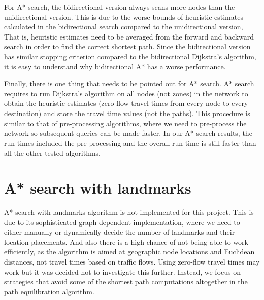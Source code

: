 For A* search,
the bidirectional version always scans more nodes than the unidirectional version.
This is due to the worse bounds of heuristic estimates calculated in the bidirectional search compared to the unidirectional version,
That is, heuristic estimates need to be averaged from the forward and backward search in order to find the correct shortest path.
Since the bidirectional version has similar stopping criterion compared to the bidirectional Dijkstra's algorithm,
it is easy to understand why bidirectional A* has a worse performance.

Finally, there is one thing that needs to be pointed out for A* search.
A* search requires to run Dijkstra's algorithm on all nodes (not zones) in the network to obtain the heuristic estimates (zero-flow travel times from every node to every destination) and store the travel time values (not the paths).
This procedure is similar to that of pre-processing algorithms,
where we need to pre-process the network so subsequent queries can be made faster.
In our A* search results, the run times included the pre-processing and the overall run time is still faster than all the other tested algorithms.

\section{A* search with landmarks}
A* search with landmarks algorithm is not implemented for this project.
This is due to its sophisticated graph dependent implementation,
where we need to either manually or dynamically decide the number of landmarks and their location placements.
And also there is a high chance of not being able to work efficiently,
as the algorithm is aimed at geographic node locations and Euclidean distances,
not travel times based on traffic flows.
Using zero-flow travel times may work but it was decided not to investigate this further.
Instead, we focus on strategies that avoid some of the shortest path computations altogether in the path equilibration algorithm.


